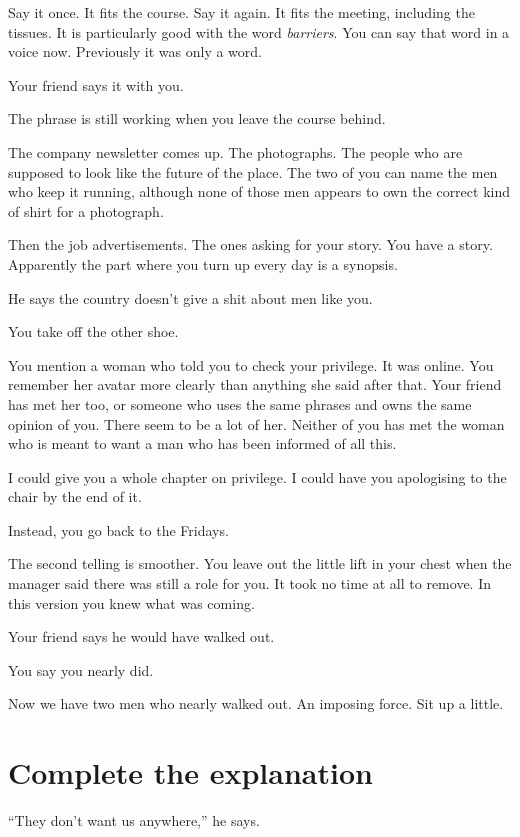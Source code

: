 \documentclass[11pt,oneside]{book}
\begin{document}
Say it once. It fits the course. Say it again. It fits the meeting, including the tissues. It is particularly good with the word \emph{barriers}. You can say that word in a voice now. Previously it was only a word.

Your friend says it with you.

The phrase is still working when you leave the course behind.

The company newsletter comes up. The photographs. The people who are supposed to look like the future of the place. The two of you can name the men who keep it running, although none of those men appears to own the correct kind of shirt for a photograph.

Then the job advertisements. The ones asking for your story. You have a story. Apparently the part where you turn up every day is a synopsis.

He says the country doesn't give a shit about men like you.

You take off the other shoe.

You mention a woman who told you to check your privilege. It was online. You remember her avatar more clearly than anything she said after that. Your friend has met her too, or someone who uses the same phrases and owns the same opinion of you. There seem to be a lot of her. Neither of you has met the woman who is meant to want a man who has been informed of all this.

I could give you a whole chapter on privilege. I could have you apologising to the chair by the end of it.

Instead, you go back to the Fridays.

The second telling is smoother. You leave out the little lift in your chest when the manager said there was still a role for you. It took no time at all to remove. In this version you knew what was coming.

Your friend says he would have walked out.

You say you nearly did.

Now we have two men who nearly walked out. An imposing force. Sit up a little.

\section*{Complete the explanation}

``They don't want us anywhere,'' he says.
\end{document}

